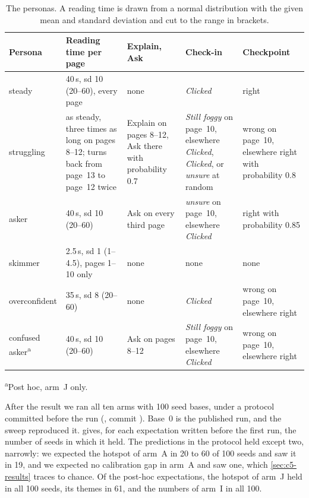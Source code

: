 \begin{table}[htbp]
  \centering
  \small
  \caption{The personas. A reading time is drawn from a normal distribution
    with the given mean and standard deviation and cut to the range in
    brackets.}
  \label{tab:personas-params}
  \newcommand*{\rr}{\raggedright\hspace{0pt}}
  \begin{tabular}{@{}lp{}p{}p{}p{}@{}}
    \toprule
    Persona & \rr Reading time per page & \rr Explain, Ask & \rr Check-in & \rr Checkpoint \tabularnewline
    \midrule
    steady & \rr 40\,s, sd 10 (20--60), every page & \rr none & \rr \emph{Clicked} & \rr right \tabularnewline
    struggling & \rr as steady, three times as long on pages 8--12; turns back from page~13 to page~12 twice & \rr Explain on pages 8--12, Ask there with probability 0.7 & \rr \emph{Still foggy} on page~10, elsewhere \emph{Clicked}, \emph{Clicked}, or \emph{unsure} at random & \rr wrong on page~10, elsewhere right with probability 0.8 \tabularnewline
    asker & \rr 40\,s, sd 10 (20--60) & \rr Ask on every third page & \rr \emph{unsure} on page~10, elsewhere \emph{Clicked} & \rr right with probability 0.85 \tabularnewline
    skimmer & \rr 2.5\,s, sd 1 (1--4.5), pages 1--10 only & \rr none & \rr none & \rr none \tabularnewline
    overconfident & \rr 35\,s, sd 8 (20--60) & \rr none & \rr \emph{Clicked} & \rr wrong on page~10, elsewhere right \tabularnewline
    confused asker\textsuperscript{a} & \rr 40\,s, sd 10 (20--60) & \rr Ask on pages 8--12 & \rr \emph{Still foggy} on page~10, elsewhere \emph{Clicked} & \rr wrong on page~10, elsewhere right \tabularnewline
    \bottomrule
  \end{tabular}\par\smallskip
  {\footnotesize \textsuperscript{a}Post hoc, arm~J only.}
\end{table}

After the result we ran all ten arms with 100 seed bases, under a protocol
committed before the run (, commit
). Base~0 is the published run, and the sweep reproduced it.
 gives, for each expectation written before the first run,
the number of seeds in which it held. The predictions in the protocol held
except two, narrowly: we expected the hotspot of arm~A in 20 to 60 of 100
seeds and saw it in 19, and we expected no calibration gap in arm~A and saw
one, which \cref{sec:c5-results} traces to chance.
Of the post-hoc expectations, the hotspot of arm~J held in all 100
seeds, its themes in 61, and the numbers of arm~I in all 100.

